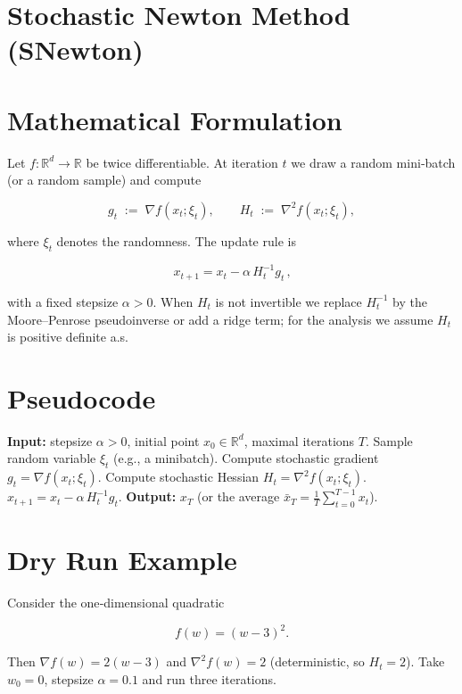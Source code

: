 \documentclass{article}
\newcommand{\R}{\mathbb{R}}
\begin{document}
\section*{Stochastic Newton Method (SNewton)}

\section*{Mathematical Formulation}
Let $f:\R^{d}\to\R$ be twice differentiable.  
At iteration $t$ we draw a random mini‑batch (or a random sample) and compute  

\[
g_t \;:=\; \nabla f(x_t; \xi_t),\qquad 
H_t \;:=\; \nabla^{2} f(x_t; \xi_t),
\]

where $\xi_t$ denotes the randomness.  
The update rule is  

\[
\boxed{\,x_{t+1}=x_t-\alpha\,H_t^{-1} g_t\,},
\tag{1}
\]

with a fixed stepsize $\alpha>0$.  
When $H_t$ is not invertible we replace $H_t^{-1}$ by the Moore–Penrose pseudoinverse or add a ridge term; for the analysis we assume $H_t$ is positive definite a.s.

\section*{Pseudocode}
\begin{algorithm}[H]
\caption{Stochastic Newton (SNewton)}\label{alg:snewton}
\begin{algorithmic}[1]
\STATE \textbf{Input:} stepsize $\alpha>0$, initial point $x_0\in\R^{d}$, maximal iterations $T$.
    \STATE Sample random variable $\xi_t$ (e.g., a minibatch).
    \STATE Compute stochastic gradient $g_t=\nabla f(x_t;\xi_t)$.
    \STATE Compute stochastic Hessian $H_t=\nabla^{2}f(x_t;\xi_t)$.
    \STATE $x_{t+1}=x_t-\alpha\,H_t^{-1} g_t$.
\ENDFOR
\STATE \textbf{Output:} $x_T$ (or the average $\bar x_T=\frac1T\sum_{t=0}^{T-1}x_t$).
\end{algorithmic}
\end{algorithm}

\section*{Dry Run Example}
Consider the one‑dimensional quadratic  

\[
f(w)=(w-3)^2 .
\]

Then $\nabla f(w)=2(w-3)$ and $\nabla^{2}f(w)=2$ (deterministic, so $H_t=2$).  
Take $w_0=0$, stepsize $\alpha=0.1$ and run three iterations.
\end{document}
